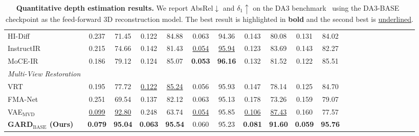 \documentclass{llmxive}
\begin{document}
\begin{table}[h]
{\begin{tabular}{lccccc ccccc ccccc ccccc}
HI-Diff~\cite{chen2023hierarchical}
&   0.237    &       71.45
&   0.122    &       84.88
&   0.063    &       94.36
&   0.143    &       80.08
&   0.131    &       84.02
\\


InstructIR~\cite{conde2024high}
&   0.215    &       74.66
&   0.142    &       81.43
&   \underline{0.054}   &      \underline{95.94}
&   0.123    &       83.69
&   0.143    &       82.27
\\


MoCE-IR~\cite{zamfir2024complexityexperts}
&  0.186     &       79.12
&  0.124     &       85.07
&  \textbf{0.053}     &       \textbf{96.16}
&  0.132     &       81.52
&  0.122    &        85.51
\\


\midrule
\textit{Multi-View Restoration} \\
\midrule

VRT~\cite{liang2024vrt}
&   0.195    &      77.72
&   \underline{0.122}    &      \underline{85.24}
&   0.056    &      95.93
&   0.147    &      78.14
&   0.125    &      84.70
\\


FMA-Net~\cite{Youk_2024_CVPR}
&   0.251    &       69.54
&   0.137    &       82.12
&   0.063    &       95.13
&   0.178    &       73.26
&   0.159    &       79.07
\\


VAE$_\text{MVD}$
&    \underline{0.099}   &       \underline{92.80}
&    0.248   &       63.74
&    \underline{0.054}   &       95.85
&    \underline{0.106}   &       \underline{87.43}
&    0.160   &        77.57
\\




\textbf{GARD$_\text{BASE}$ (Ours)}
&   \textbf{0.079}    &   \textbf{95.04}
&   \textbf{0.063}    &   \textbf{95.54}
&   0.060    &   95.23
&   \textbf{0.081}   &    \textbf{91.60}
&   \textbf{0.059}    &   \textbf{95.76}
\\


\bottomrule
\end{tabular}
}
\caption{\textbf{Quantitative depth estimation results.} We report AbsRel$\downarrow$ and $\delta_1\uparrow$ on the DA3 benchmark~\cite{depthanything3} using the DA3-BASE~\cite{depthanything3} checkpoint as the feed-forward 3D reconstruction model. The best result is highlighted in \textbf{bold} and the second best is \underline{underlined}.}
\label{supple_tab:da3_base_depth}
\end{table}
\end{document}
